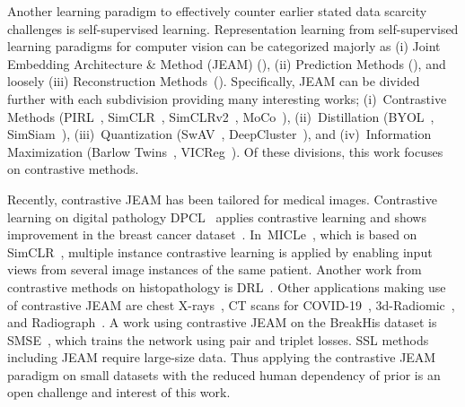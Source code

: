 \documentclass[conference]{IEEEtran}
\begin{document}
Another learning paradigm to effectively counter earlier stated data scarcity challenges is self-supervised learning. Representation learning from self-supervised learning paradigms for computer vision can be categorized majorly as (i) Joint Embedding Architecture \& Method (JEAM) (\cite{chen2020simple, grill2020bootstrap, caron2020unsupervised, zbontar2021barlow}), (ii) Prediction Methods (\cite{veeling2018rotation, noroozi2016unsupervised, doersch2015unsupervised}), and loosely (iii) Reconstruction Methods~(\cite{kingma2013auto, goodfellow2014generative}).
Specifically, JEAM can be divided further with each subdivision providing many interesting works; (i)~Contrastive Methods (PIRL~\cite{misra2020self}, SimCLR~\cite{chen2020simple}, SimCLRv2~\cite{chen2020big}, MoCo~\cite{he2020momentum}), (ii)~Distillation (BYOL~\cite{grill2020bootstrap}, SimSiam~\cite{chen2021exploring}), (iii)~Quantization (SwAV~\cite{caron2020unsupervised}, DeepCluster~\cite{caron2018deep}), and (iv)~Information Maximization (Barlow Twins~\cite{zbontar2021barlow}, VICReg~\cite{bardes2021vicreg}).
Of these divisions, this work focuses on contrastive methods.











Recently, contrastive JEAM has been tailored for medical images. Contrastive learning on digital pathology DPCL~\cite{ciga2022self} applies contrastive learning and shows improvement in the breast cancer dataset~\cite{aresta2019bach}. 
In~MICLe~\cite{azizi2021big}, which is based on SimCLR~\cite{chen2020simple}, multiple instance contrastive learning is applied by enabling input views from several image instances of the same patient.
Another work from contrastive methods on histopathology is DRL~\cite{xu2020dataefficient}.
Other applications making use of contrastive JEAM are chest X-rays~\cite{sowrirajan2021moco, liu2019align}, CT scans for COVID-19~\cite{he2020sample}, 3d-Radiomic~\cite{li2021imbalance}, and Radiograph~\cite{zhou2020comparing}.
A work using contrastive JEAM on the BreakHis dataset is SMSE~\cite{sun2021magnificationindependent}, which trains the network using pair and triplet losses.
SSL methods including JEAM require large-size data. Thus applying the contrastive JEAM paradigm on small datasets with the reduced human dependency of prior is an open challenge and interest of this work.
\end{document}
